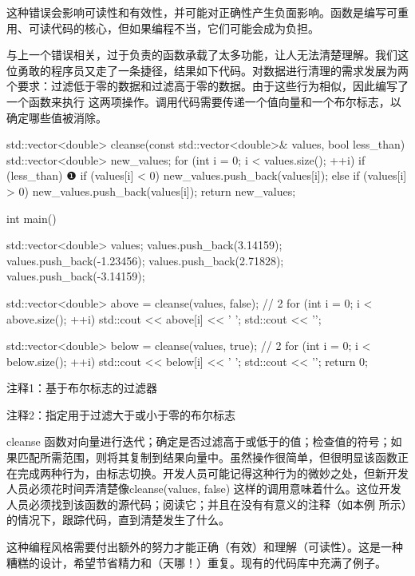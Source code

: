 这种错误会影响可读性和有效性，并可能对正确性产生负面影响。函数是编写可重用、可读代码的核心，但如果编程不当，它们可能会成为负担。


与上一个错误相关，过于负责的函数承载了太多功能，让人无法清楚理解。我们这位勇敢的程序员又走了一条捷径，结果如下代码。对数据进行清理的需求发展为两个要求：过滤低于零的数据和过滤高于零的数据。由于这些行为相似，因此编写了一个函数来执行 这两项操作。调用代码需要传递一个值向量和一个布尔标志，以确定哪些值被消除。


\begin{cpp}
std::vector<double> cleanse(const std::vector<double>& values,
    bool less_than) {
  std::vector<double> new_values;
  for (int i = 0; i < values.size(); ++i)
    if (less_than) { ❶
      if (values[i] < 0)
        new_values.push_back(values[i]);
    } else
        if (values[i] > 0)
          new_values.push_back(values[i]);
  return new_values;
}

int main() {
  std::vector<double> values;
  values.push_back(3.14159);
  values.push_back(-1.23456);
  values.push_back(2.71828);
  values.push_back(-3.14159);

  std::vector<double> above = cleanse(values, false); // 2
  for (int i = 0; i < above.size(); ++i)
    std::cout << above[i] << ' ';
  std::cout << '\n';

  std::vector<double> below = cleanse(values, true); // 2
  for (int i = 0; i < below.size(); ++i)
    std::cout << below[i] << ' ';
  std::cout << '\n';
  return 0;
}
\end{cpp}

{\footnotesize
注释1：基于布尔标志的过滤器

注释2：指定用于过滤大于或小于零的布尔标志
}


cleanse 函数对向量进行迭代；确定是否过滤高于或低于的值；检查值的符号；如果匹配所需范围，则将其复制到结果向量中。虽然操作很简单，但很明显该函数正在完成两种行为，由标志切换。开发人员可能记得这种行为的微妙之处，但新开发人员必须花时间弄清楚像cleanse(values, false) 这样的调用意味着什么。这位开发人员必须找到该函数的源代码；阅读它；并且在没有有意义的注释（如本例 所示）的情况下，跟踪代码，直到清楚发生了什么。

这种编程风格需要付出额外的努力才能正确（有效）和理解（可读性）。这是一种糟糕的设计，希望节省精力和（天哪！）重复。现有的代码库中充满了例子。

